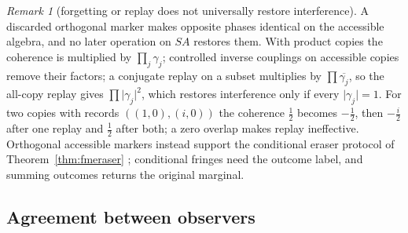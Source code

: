 \documentclass[aps,pra,onecolumn,superscriptaddress,nofootinbib,10pt]{revtex4-2}
\theoremstyle{definition}
\theoremstyle{remark}
\newtheorem{remark}[theorem]{Remark}
\begin{document}
\begin{remark}[forgetting or replay does not universally restore interference]\label{rem:fmcopies}
A discarded orthogonal marker makes opposite phases identical on the accessible algebra, and no later
operation on $SA$ restores them.  With product copies the coherence is multiplied by $\prod_j\gamma_j$; controlled
inverse couplings on accessible copies remove their factors; a conjugate replay on a subset multiplies by
$\prod\overline{\gamma_j}$, so the all-copy replay gives $\prod\lvert\gamma_j\rvert^2$, which restores interference only if every $\lvert\gamma_j\rvert=1$.  For two copies with
records $((1,0),(i,0))$ the coherence $\tfrac12$ becomes $-\tfrac12$, then $-\tfrac i2$ after one replay and $\tfrac12$ after both; a zero overlap
makes replay ineffective.  Orthogonal accessible markers instead support the conditional eraser
protocol of Theorem~\ref{thm:fmeraser} \cite{n2-scully,n2-herzog,n2-kim}; conditional fringes need the outcome
label, and summing outcomes returns the original marginal.
\end{remark}

\subsection{Agreement between observers}\label{sec:fmagreement}
\end{document}
